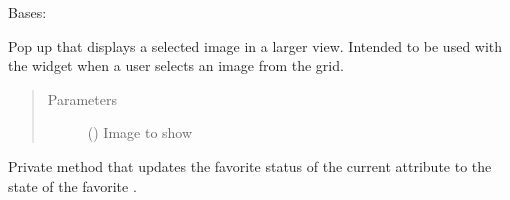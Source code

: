 \documentclass[letterpaper,10pt,english]{sphinxmanual}
\begin{document}
\begin{fulllineitems}
\label{\detokenize{polo.windows:polo.windows.image_pop_dialog.ImagePopDialog}}
Bases: 

Pop up that displays a selected image in a larger view. Intended
to be used with the  widget when a user selects an
image from the grid.
\begin{quote}\begin{description}
\item[{Parameters}] \leavevmode
{} ({\hyperref[\detokenize{polo.crystallography:polo.crystallography.image.Image}]{}}) \textendash{} Image to show

\end{description}\end{quote}

\begin{fulllineitems}
\label{\detokenize{polo.windows:polo.windows.image_pop_dialog.ImagePopDialog._change_favorite_status}}
Private method that updates the favorite status of the current 
{\hyperref[\detokenize{polo.windows:polo.windows.image_pop_dialog.ImagePopDialog.image}]{}}
attribute to the state of the favorite .

\end{fulllineitems}



\end{fulllineitems}
\end{document}
